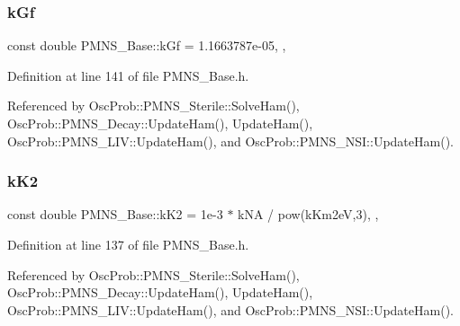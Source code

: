 \mbox{\label{classOscProb_1_1PMNS__Base_a7f26a3456128234b2ae6cc9141a6532f}} 
\subsubsection{\texorpdfstring{k\+Gf}{kGf}}
{\footnotesize\ttfamily const double P\+M\+N\+S\+\_\+\+Base\+::k\+Gf = 1.\+1663787e-\/05\hspace{0.3cm}{\ttfamily [static]}, {\ttfamily [protected]}, {\ttfamily [inherited]}}



Definition at line 141 of file P\+M\+N\+S\+\_\+\+Base.\+h.



Referenced by Osc\+Prob\+::\+P\+M\+N\+S\+\_\+\+Sterile\+::\+Solve\+Ham(), Osc\+Prob\+::\+P\+M\+N\+S\+\_\+\+Decay\+::\+Update\+Ham(), Update\+Ham(), Osc\+Prob\+::\+P\+M\+N\+S\+\_\+\+L\+I\+V\+::\+Update\+Ham(), and Osc\+Prob\+::\+P\+M\+N\+S\+\_\+\+N\+S\+I\+::\+Update\+Ham().

\mbox{\label{classOscProb_1_1PMNS__Base_a326fc5016d7dd7ce05682c06cdcb6d94}} 
\subsubsection{\texorpdfstring{k\+K2}{kK2}}
{\footnotesize\ttfamily const double P\+M\+N\+S\+\_\+\+Base\+::k\+K2 = 1e-\/3 $\ast$ k\+N\+A / pow(k\+Km2e\+V,3)\hspace{0.3cm}{\ttfamily [static]}, {\ttfamily [protected]}, {\ttfamily [inherited]}}



Definition at line 137 of file P\+M\+N\+S\+\_\+\+Base.\+h.



Referenced by Osc\+Prob\+::\+P\+M\+N\+S\+\_\+\+Sterile\+::\+Solve\+Ham(), Osc\+Prob\+::\+P\+M\+N\+S\+\_\+\+Decay\+::\+Update\+Ham(), Update\+Ham(), Osc\+Prob\+::\+P\+M\+N\+S\+\_\+\+L\+I\+V\+::\+Update\+Ham(), and Osc\+Prob\+::\+P\+M\+N\+S\+\_\+\+N\+S\+I\+::\+Update\+Ham().

